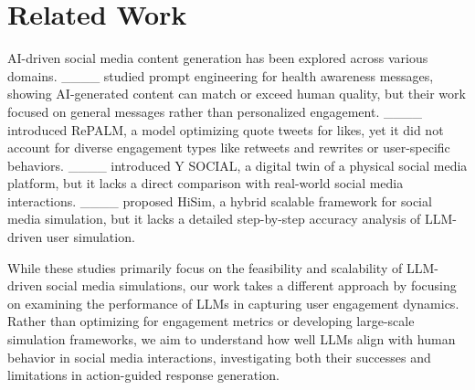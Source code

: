 \section{Related Work}
AI-driven social media content generation has been explored across various domains. ____ studied prompt engineering for health awareness messages, showing AI-generated content can match or exceed human quality, but their work focused on general messages rather than personalized engagement. ____ introduced RePALM, a model optimizing quote tweets for likes, yet it did not account for diverse engagement types like retweets and rewrites or user-specific behaviors. ____ introduced Y SOCIAL, a digital twin of a physical social media platform, but it lacks a direct comparison with real-world social media interactions. ____ proposed HiSim, a hybrid scalable framework for social media simulation, but it lacks a detailed step-by-step accuracy analysis of LLM-driven user simulation. 

While these studies primarily focus on the feasibility and scalability of LLM-driven social media simulations, our work takes a different approach by focusing on examining the performance of LLMs in capturing user engagement dynamics.
Rather than optimizing for engagement metrics or developing large-scale simulation frameworks, we aim to understand how well LLMs align with human behavior in social media interactions, investigating both their successes and limitations in action-guided response generation.